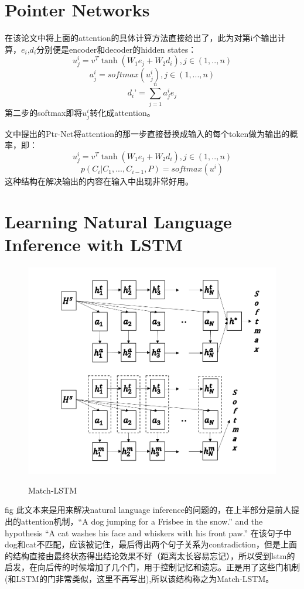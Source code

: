 \documentclass[UTF8]{article}
\begin{document}
\section{Pointer Networks}

在该论文中将上面的attention的具体计算方法直接给出了，此为对第i个输出计算，$e_i$,$d_i$分别便是encoder和decoder的hidden states：
$$u_j^i=v^T\tanh(W_1e_j+W_2d_i) , j\in(1,..,n)$$
$$a_j^i=softmax(u_j^i),j\in(1,...,n)$$
$$d_i’=\sum_{j=1}^na_j^ie_j$$
第二步的softmax即将$u_j^i$转化成attention。

文中提出的Ptr-Net将attention的那一步直接替换成输入的每个token做为输出的概率，即：
$$u_j^i=v^T\tanh(W_1e_j+W_2d_i) , j\in(1,..,n)$$
$$p(C_i|C_1,...,C_{i-1},P)=softmax(u^i)$$
这种结构在解决输出的内容在输入中出现非常好用。

\section{Learning Natural Language Inference with LSTM}

\begin{figure}[htpb]
    \centering
    \includegraphics[width=0.7\linewidth]{Match-LSTM.png}
    \label{fig:Match-LSTM}
    \caption{Match-LSTM}
\end{figure}
fig
此文本来是用来解决natural language inference的问题的，在上半部分是前人提出的attention机制，“A dog jumping for a Frisbee in the snow.” and the hypothesis “A cat washes his face and whiskers with his front paw.” 在该句子中dog和cat不匹配，应该被记住，最后得出两个句子关系为contradiction，但是上面的结构直接由最终状态得出结论效果不好（距离太长容易忘记），所以受到lstm的启发，在向后传的时候增加了几个门，用于控制记忆和遗忘。正是用了这些门机制(和LSTM的门非常类似，这里不再写出),所以该结构称之为Match-LSTM。
\end{document}
